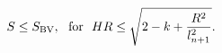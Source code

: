 \begin{equation}
\label{2eq17}
S \le S_{\rm BV},~~ {\rm for}~~
HR \le \sqrt {2-k+ \frac{R^2}{l_{n+1}^2}}.
\end{equation}


